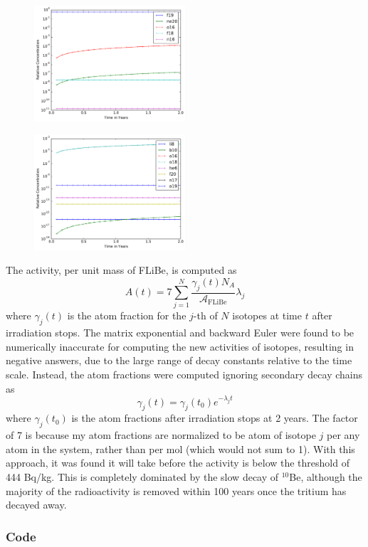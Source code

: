 \documentclass[12pt]{article}
\newenvironment{solnum}[2][Solution]{\begin{trivlist}
\item[\hskip \labelsep {\bfseries #1}\hskip \labelsep {\bfseries #2:}]\hspace{0.3in}\newline\newline}{\end{trivlist}}
\begin{document}
\begin{solnum}{1-2}
\begin{figure}
    \end{figure}
    \begin{figure}
        \centering
        \includegraphics[width=0.5\textwidth]{p2.pdf}
    \end{figure}
    \begin{figure}
        \centering
        \includegraphics[width=0.5\textwidth]{p3.pdf}
    \end{figure}
\end{solnum}

\begin{solnum}{1-3}
    The activity, per unit mass of FLiBe, is computed as
    \begin{equation}
        A(t) = 7\sum_{j=1}^N \frac{\gamma_j(t)N_A}{\mathcal{A}_\text{FLiBe}}\lambda_j
    \end{equation}
    where $\gamma_j(t)$ is the atom fraction for the $j$-th of $N$ isotopes at time
    $t$ after irradiation stops. The matrix
    exponential and backward Euler were found to be numerically inaccurate for computing the new
    activities of isotopes, resulting in negative answers, due to the large range of
    decay constants relative to the time scale.  Instead, the
    atom fractions were computed ignoring secondary decay chains as
    \begin{equation}
        \gamma_j(t) = \gamma_j(t_0)e^{-\lambda_j t}
    \end{equation}
    where $\gamma_j(t_0)$ is the atom fractions after irradiation stops at 2 years.
    The factor of 7 is because my atom fractions are normalized to be atom of isotope
    $j$ per any atom in the system, rather than per mol (which would not sum to 1).  With this
    approach, it was found it will take  before the activity is below the threshold of 444 Bq/kg.
    This is completely dominated by the slow decay of $^{10}$Be, although the
    majority of the radioactivity is removed within 100 years once the tritium has
    decayed away.
\end{solnum}

\clearpage
\subsubsection*{Code}

\end{document}
